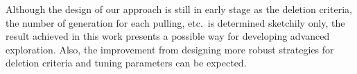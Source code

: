 Although the design of our approach is still in early stage as the
deletion criteria, the number of generation for each pulling, etc.\ is
determined sketchily only, the result achieved in this work presents a
possible way for developing advanced exploration.
Also, the improvement from designing more robust strategies for
deletion criteria and tuning parameters can be expected.

